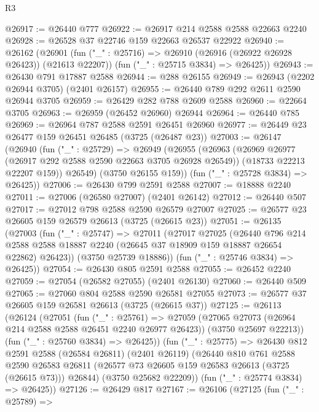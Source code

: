 \begin{lexlean}{R3}
\begin{coremodule}
@26917 := @26440 @777
@26922 := @26917 @214 @2588 @2588 @22663 @2240
@26928 := @26528 @37 @22746 @159 @22663 @26537 @22922
@26940 := @26162
    (@26901
      (fun ("_" : @25716) => @26910 (@26916 (@26922 @26928 @26423)) (@21613 @22207))
      (fun ("_" : @25715 @3834) => @26425))
@26943 := @26430 @791 @17887 @2588
@26944 := @288 @26155
@26949 := @26943 (@2202 @26944 @3705) (@2401 @26157)
@26955 := @26440 @789 @292 @2611 @2590 @26944 @3705
@26959 := @26429 @282 @788 @2609 @2588
@26960 := @22664 @3705
@26963 := @26959 (@26452 @26960) @26944
@26964 := @26440 @785
@26969 := @26964 @787 @2588 @2591 @26451 @26960
@26977 := @26449 @23 @26477 @159 @26451 @26485 (@3725 (@26487 @23))
@27003 := @26147
    (@26940
      (fun ("_" : @25729) =>
      @26949
        (@26955
          (@26963
            (@26969 @26977 (@26917 @292 @2588 @2590 @22663 @3705 @26928 @26549))
            (@18733 @22213 @22207 @159))
          @26549)
        (@3750 @26155 @159))
      (fun ("_" : @25728 @3834) => @26425))
@27006 := @26430 @799 @2591 @2588
@27007 := @18888 @2240
@27011 := @27006 (@26580 @27007) (@2401 @26142)
@27012 := @26440 @507
@27017 := @27012 @798 @2588 @2590 @26579 @27007
@27025 := @26577 @23 @26605 @159 @26579 @26613 (@3725 (@26615 @23))
@27051 := @26135
    (@27003
      (fun ("_" : @25747) =>
      @27011
        (@27017
          @27025
          (@26440
            @796
            @214
            @2588
            @2588
            @18887
            @2240
            (@26645 @37 @18909 @159 @18887 @26654 @22862)
            @26423))
        (@3750 @25739 @18886))
      (fun ("_" : @25746 @3834) => @26425))
@27054 := @26430 @805 @2591 @2588
@27055 := @26452 @2240
@27059 := @27054 (@26582 @27055) (@2401 @26130)
@27060 := @26440 @509
@27065 := @27060 @804 @2588 @2590 @26581 @27055
@27073 := @26577 @37 @26605 @159 @26581 @26613 (@3725 (@26615 @37))
@27125 := @26113
    (@26124
      (@27051
        (fun ("_" : @25761) =>
        @27059
          (@27065 @27073 (@26964 @214 @2588 @2588 @26451 @2240 @26977 @26423))
          (@3750 @25697 @22213))
        (fun ("_" : @25760 @3834) => @26425))
      (fun ("_" : @25775) =>
      @26430
        @812
        @2591
        @2588
        (@26584 @26811)
        (@2401 @26119)
        (@26440
          @810
          @761
          @2588
          @2590
          @26583
          @26811
          (@26577 @73 @26605 @159 @26583 @26613 (@3725 (@26615 @73)))
          @26844)
        (@3750 @25682 @22209))
      (fun ("_" : @25774 @3834) => @26425))
@27126 := @26429 @817
@27167 := @26106
    (@27125
      (fun ("_" : @25789) =>

\end{coremodule}
\end{lexlean}
